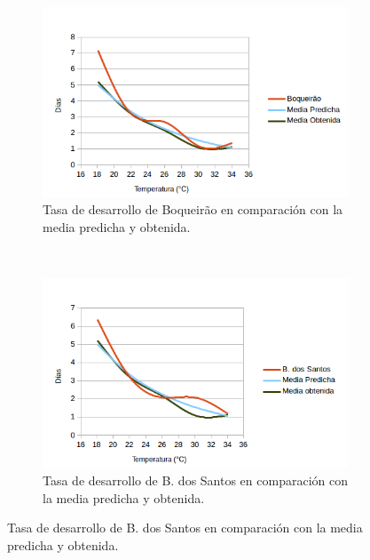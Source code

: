 \begin{figure}[!htbp]
    \centering
    \begin{subfigure}[b]{0.45\textwidth}
            \includegraphics[width=\textwidth]{capitulo-6/graphics/desarrollo-pupa-1.png}
            \caption{Tasa de desarrollo de Boqueirão en comparación con la media predicha y obtenida.}
    \end{subfigure}
    ~~~~
    \begin{subfigure}[b]{0.45\textwidth}
            \includegraphics[width=\textwidth]{capitulo-6/graphics/desarrollo-pupa-2.png}
            \caption{Tasa de desarrollo de B. dos Santos en comparación con la media predicha y obtenida.}


\end{subfigure}
\end{figure}

